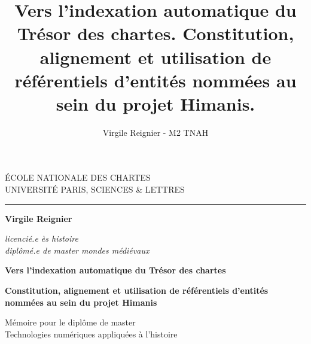 \documentclass[a4paper,12pt,twoside]{book}
\author{Virgile Reignier - M2 TNAH}
\title{Vers l’indexation automatique du Trésor des chartes. Constitution, alignement et utilisation de référentiels d’entités nommées au sein du projet Himanis.}
\begin{document}
	\begin{titlepage}
		\begin{center}
			
			\bigskip
			
			\begin{large}				
				ÉCOLE NATIONALE DES CHARTES\\
				UNIVERSITÉ PARIS, SCIENCES \& LETTRES
			\end{large}
			\begin{center}\rule{2cm}{0.02cm}\end{center}
			
			\bigskip
			\bigskip
			\bigskip
			\begin{Large}
				\textbf{Virgile Reignier}\\
			\end{Large}
			\begin{normalsize} \textit{licencié.e ès histoire}\\
				\textit{diplômé.e de master mondes médiévaux}
			\end{normalsize}
			
			\bigskip
			\bigskip
			\bigskip
			
			\begin{Huge}
				\textbf{Vers l’indexation automatique du Trésor des chartes}\\
			\end{Huge}
			\bigskip
			\bigskip
			\begin{LARGE}
				\textbf{Constitution, alignement et utilisation de référentiels d’entités nommées au sein du projet Himanis}\\
			\end{LARGE}
			
			\bigskip
			\bigskip
			\bigskip
			\begin{large}
			\end{large}
			\vfill
			
			\begin{large}
				Mémoire 
				pour le diplôme de master \\
				\og{} Technologies numériques appliquées à l'histoire \fg{} \\
			\end{large}
			
		\end{center}
	\end{titlepage}
	
	\thispagestyle{empty}	
	\cleardoublepage
	
	\frontmatter
\end{document}

